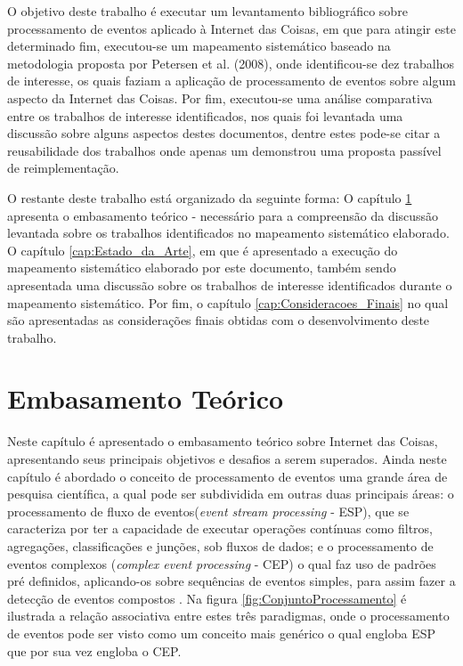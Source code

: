\documentclass[ti,table]{texufpel} %
\begin{document}
  

O objetivo deste trabalho é executar um levantamento bibliográfico sobre processamento de eventos aplicado à Internet das Coisas, em que para atingir este determinado fim, executou-se um mapeamento sistemático baseado na metodologia proposta por Petersen et al. (2008), onde identificou-se dez trabalhos de interesse, os quais faziam a aplicação de processamento de eventos sobre algum aspecto da Internet das Coisas. Por fim, executou-se uma análise comparativa entre os trabalhos de interesse identificados, nos quais foi levantada uma discussão sobre alguns aspectos destes documentos, dentre estes pode-se citar a reusabilidade dos trabalhos onde apenas um demonstrou uma proposta passível de reimplementação.  

  

  

O restante deste trabalho está organizado da seguinte forma: O capítulo \ref{cap:Embasamento_Teorico} apresenta o embasamento teórico - necessário para a compreensão da discussão levantada sobre os trabalhos identificados no mapeamento sistemático elaborado. O capítulo \ref{cap:Estado_da_Arte}, em que é apresentado a execução do mapeamento sistemático elaborado por este documento, também sendo apresentada uma discussão sobre os trabalhos de interesse identificados durante o mapeamento sistemático. Por fim, o capítulo \ref{cap:Consideracoes_Finais} no qual são apresentadas as considerações finais obtidas com o desenvolvimento deste trabalho. 

  

  

  

  

\chapter{Embasamento Teórico} 

\label{cap:Embasamento_Teorico} 

  

Neste capítulo é apresentado o embasamento teórico sobre Internet das Coisas, apresentando seus principais objetivos e desafios a serem superados. Ainda neste capítulo é abordado o conceito de processamento de eventos uma grande área de pesquisa científica, a qual pode ser subdividida em outras duas principais áreas: o processamento de fluxo de eventos(\textit{event stream processing} - ESP), que se caracteriza por ter a capacidade de executar operações contínuas como filtros, agregações, classificações e junções, sob fluxos de dados; e o processamento de eventos complexos (\textit{complex event processing} - CEP) o qual faz uso de padrões pré definidos, aplicando-os sobre sequências de eventos simples, para assim fazer a detecção de eventos compostos \cite{dayarathna2018recent}. Na figura \ref{fig:ConjuntoProcessamento} é ilustrada a relação associativa entre estes três paradigmas, onde o processamento de eventos pode ser visto como um conceito mais genérico o qual engloba ESP que por sua vez engloba o CEP. 
\end{document}
